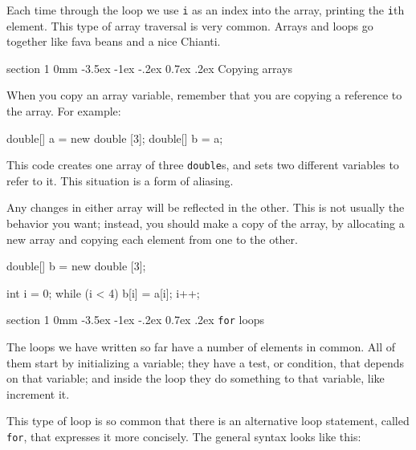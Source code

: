\documentclass{book}
\makeatletter
\renewcommand{\section}{\@startsection 
    {section} {1} {0mm}%
    {-3.5ex \@plus -1ex \@minus -.2ex}%
    {0.7ex \@plus.2ex}%
    {\normalfont\Large\bfseries}}
\makeatother
\begin{document}

Each time through the loop we use {\tt i} as an index into
the array, printing the {\tt i}th element.  This type of
array traversal is very common.  Arrays and loops go together
like fava beans and a nice Chianti.


\section{Copying arrays}

When you copy an array variable, remember that you are
copying a reference to the array.  For example:

\begin{verbatimtab}
    double[] a = new double [3];
    double[] b = a;
\end{verbatimtab}
%
This code creates one array of three {\tt double}s, and
sets two different variables to refer to it.
This situation is a form of aliasing.




Any changes in either array
will be reflected in the other.  This is not usually the
behavior you want; instead, you should make a copy of the
array, by allocating a new array and copying each element from
one to the other.

\begin{verbatimtab}
    double[] b = new double [3];

    int i = 0;
    while (i < 4) {
      b[i] = a[i];
      i++;
    }
\end{verbatimtab}

\section{{\tt for} loops}

The loops we have written so far have a number of elements
in common.  All of them start by initializing a variable;
they have a test, or condition, that depends on that variable;
and inside the loop they do something to that variable,
like increment it.


This type of loop is so common that there is an alternative
loop statement, called {\tt for}, that expresses it more
concisely.  The general syntax looks like this:
\end{document}
